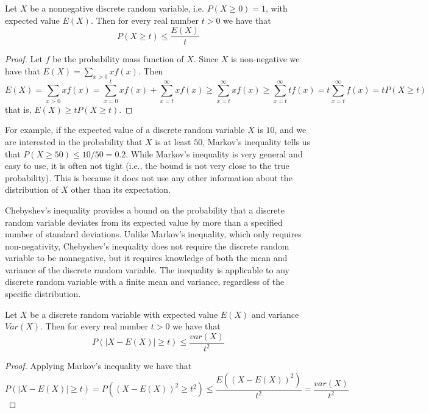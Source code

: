 \begin{proposition}
Let $X$ be a nonnegative discrete random variable, i.e. $P\left( X \geq 0 \right) = 1$, with expected value $E(X)$. Then for every real number $t>0$ we have that 
\[
P \left( X \geq t \right) \leq \frac{E(X)}{t}
\]
\end{proposition}
\begin{proof}
Let $f$ be the probability mass function of $X$. Since $X$ is non-negative we have that $E(X) = \sum_{x>0} x f \left( x \right)$. Then
\[
E(X) = \sum_{x>0} x f \left( x \right) = \sum_{x=0}^{t} x f \left( x \right) + \sum_{x=t}^{\infty} x f \left( x \right) \geq
\sum_{x=t}^{\infty} x f \left( x \right) \geq \sum_{x=t}^{\infty} t f \left( x \right) = t \sum_{x=t}^{\infty} f \left( x \right) =
t P \left( X \geq t \right)
\]
that is, $E(X) \geq t P \left( X \geq t \right)$.
\end{proof}

For example, if the expected value of a discrete random variable $X$ is $10$, and we are interested in the probability that $X$ is at least $50$, Markov's inequality tells us that $P(X \geq 50) \leq 10/50 = 0.2$. While Markov's inequality is very general and easy to use, it is often not tight (i.e., the bound is not very close to the true probability). This is because it does not use any other information about the distribution of $X$ other than its expectation.

Chebyshev's inequality provides a bound on the probability that a discrete random variable deviates from its expected value by more than a specified number of standard deviations. Unlike Markov's inequality, which only requires non-negativity, Chebyshev's inequality does not require the discrete random variable to be nonnegative, but it requires knowledge of both the mean and variance of the discrete random variable. The inequality is applicable to any discrete random variable with a finite mean and variance, regardless of the specific distribution.

\begin{corollary}
 Let $X$ be a discrete random variable with expected value $E(X)$ and variance $Var(X)$. Then for every real number $t > 0$ we have that
\[
P \left( \left| X - E(X) \right| \geq t \right) \leq \frac{var(X)}{t^2}
\]
\end{corollary}
\begin{proof}
Applying Markov's inequality we have that
\[
P \left( \left| X - E(X) \right| \geq t \right) = P \left( \left( X - E(X) \right)^2 \geq t^2 \right) \leq \frac{E \left( \left( X - E(X) \right)^2 \right)}{t^2} = \frac{var(X)}{t^2}
\]
\end{proof}


